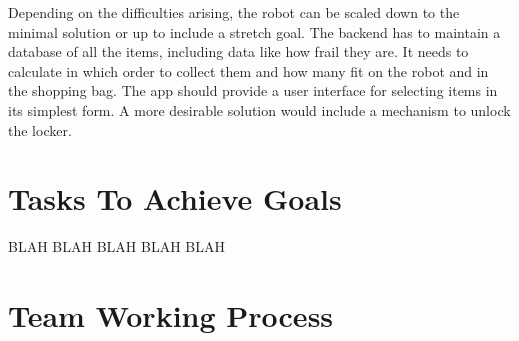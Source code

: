 \documentclass[12pt]{article}
\begin{document}
Depending on the difficulties arising, the robot can be scaled down to the minimal solution or up to include a stretch goal.
\newline\newline
The backend has to maintain a database of all the items, including data like how frail they are. It needs to calculate in which order to collect them and how many fit on the robot and in the shopping bag. 
\newline\newline
The app should provide a user interface for selecting items in its simplest form. A more desirable solution would include a mechanism to unlock the locker.


\section*{Tasks To Achieve Goals}

BLAH BLAH BLAH
\newline
BLAH BLAH

\section*{Team Working Process}
\end{document}
